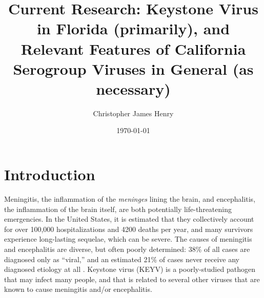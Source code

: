 \documentclass[12pt]{article}
\title%
{Current Research: Keystone Virus in Florida (primarily), and Relevant Features of California Serogroup Viruses in General (as necessary)}
\author%
{Christopher James Henry}
\date{\today}
\newcommand{\cjh}{\textcolor{blue}{cjh}}
\newcommand{\tjh}{\textcolor{red}{tjh}}
\newcommand{\msg}[3]{(#1 $\rightarrow$ #2: #3)}
\newcommand{\mtc}[1]{\msg\tjh\cjh{#1}}
\begin{document}
    \titlepage

    


    \section{Introduction}
        \label{intro}

        Meningitis, the inflammation of the \textit{meninges} lining the brain, and encephalitis, the inflammation of the brain itself, are both potentially life-threatening emergencies. In the United States, it is estimated that they collectively account for over 100,000 hospitalizations and 4200 deaths per year\cite{george2014encephalitis,holmquist2008meningitis}, and many survivors experience long-lasting sequelae, which can be severe. The causes of meningitis and encephalitis are diverse, but often poorly determined: 38\% of all cases are diagnosed only as ``viral,'' and an estimated 21\% of cases never receive any diagnosed etiology at all \cite{george2014encephalitis,holmquist2008meningitis}. Keystone virus (KEYV) is a poorly-studied pathogen that may infect many people, and that is related to several other viruses that are known to cause meningitis and/or encephalitis.
\end{document}
